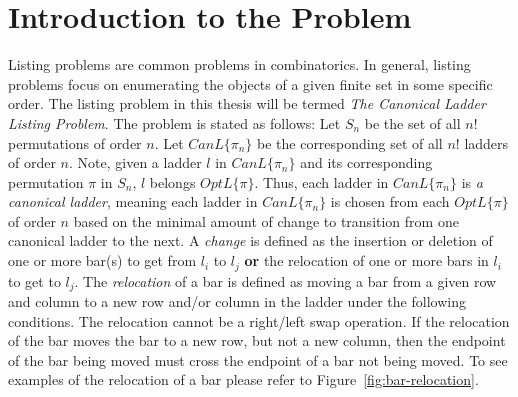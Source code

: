 \section{Introduction to the Problem}
Listing problems are common problems in combinatorics. In general, listing problems 
focus on enumerating the objects of a given finite set in some specific order. The listing problem in this thesis 
will be termed \emph{The Canonical Ladder Listing Problem}. The problem is stated as follows: Let 
$S_{n}$ be the set of all $n!$ permutations of order $n$. Let $CanL\{\pi_{n}\}$ be the corresponding 
set of all $n!$ ladders of order $n$. Note, given a ladder $l$ in $CanL\{\pi_{n}\}$ and its corresponding 
permutation $\pi$ in $S_{n}$, $l$ belongs 
$OptL\{\pi\}$. Thus, each ladder in $CanL\{\pi_{n}\}$ is \emph{a canonical ladder}, meaning each ladder in $CanL\{\pi_{n}\}$
is chosen from each $OptL\{\pi\}$ of order $n$ based on the minimal amount of change 
to transition from one canonical ladder to the next. A \emph{change} 
is defined as the insertion or deletion of one or more bar(s) to get from $l_{i}$ to $l_{j}$ \textbf{or} the relocation of one or more bars 
in $l_{i}$ to get to $l_{j}$. The \emph{relocation} of a bar is defined as moving a bar from a given row and column 
to a new row and/or column in the ladder under the following conditions.
The relocation cannot be a right/left swap operation. 
If the relocation of the bar moves the bar to a new row, but not a new column, then the endpoint 
of the bar being moved must cross the endpoint of a bar not being moved. To see examples of the relocation of a bar please refer to 
Figure~\ref{fig:bar-relocation}.

